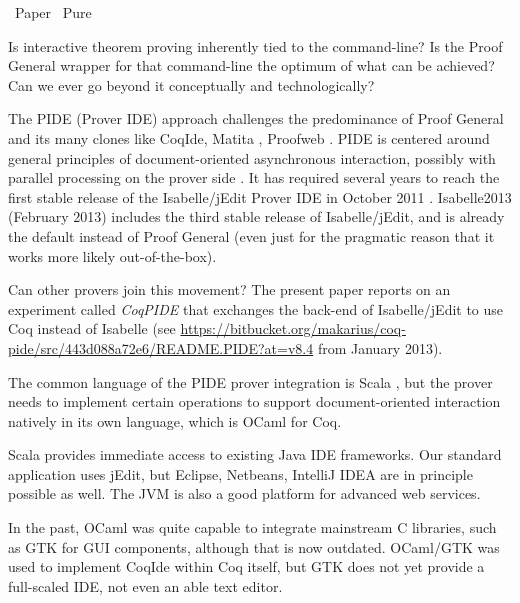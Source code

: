 \begin{isabellebody}\def\isabellecontext{Paper}\isadelimtheory
\endisadelimtheory
\isatagtheory
{}\isamarkupfalse \ Paper\isanewline
{}\ Pure\isanewline
{}\endisatagtheory
{\isafoldtheory}\isadelimtheory
\endisadelimtheory
{}
\isamarkuptrue \begin{isamarkuptext}Is interactive theorem proving inherently tied to the
  command-line?  Is the Proof General wrapper for that command-line
  the optimum of what can be achieved?  Can we ever go beyond it
  conceptually and technologically?

  The PIDE (Prover IDE) approach challenges the predominance of Proof
  General \cite{Aspinall:TACAS:2000} and its many clones like CoqIde,
  Matita \cite{Asperti-et-al:2007}, Proofweb \cite{Kaliszyk:2006}.
  PIDE is centered around general principles of document-oriented
  asynchronous interaction, possibly with parallel processing on the
  prover side \cite{Wenzel:2010,Wenzel:2011:CICM,Wenzel:2012:UITP}.
  It has required several years to reach the first stable release of
  the Isabelle/jEdit Prover IDE in October 2011
  \cite{Wenzel:2012:CICM}.  Isabelle2013 (February 2013) includes the
  third stable release of Isabelle/jEdit, and is already the default
  instead of Proof General (even just for the pragmatic reason that it
  works more likely out-of-the-box).

  Can other provers join this movement?  The present paper reports on
  an experiment called \emph{CoqPIDE} that exchanges the back-end of
  Isabelle/jEdit to use Coq instead of Isabelle (see
  \url{https://bitbucket.org/makarius/coq-pide/src/443d088a72e6/README.PIDE?at=v8.4}
  from January 2013).

  \smallskip The common language of the PIDE prover integration is
  Scala \cite{Scala:2004}, but the prover needs to implement certain
  operations to support document-oriented interaction natively in its
  own language, which is OCaml for Coq.

  Scala provides immediate access to existing Java IDE frameworks.
  Our standard application uses jEdit, but Eclipse, Netbeans, IntelliJ
  IDEA are in principle possible as well.  The JVM is also a good
  platform for advanced web services.

  In the past, OCaml was quite capable to integrate mainstream C
  libraries, such as GTK for GUI components, although that is now
  outdated.  OCaml/GTK was used to implement CoqIde within Coq itself,
  but GTK does not yet provide a full-scaled IDE, not even an able
  text editor.


\end{isamarkuptext}
\end{isabellebody}
